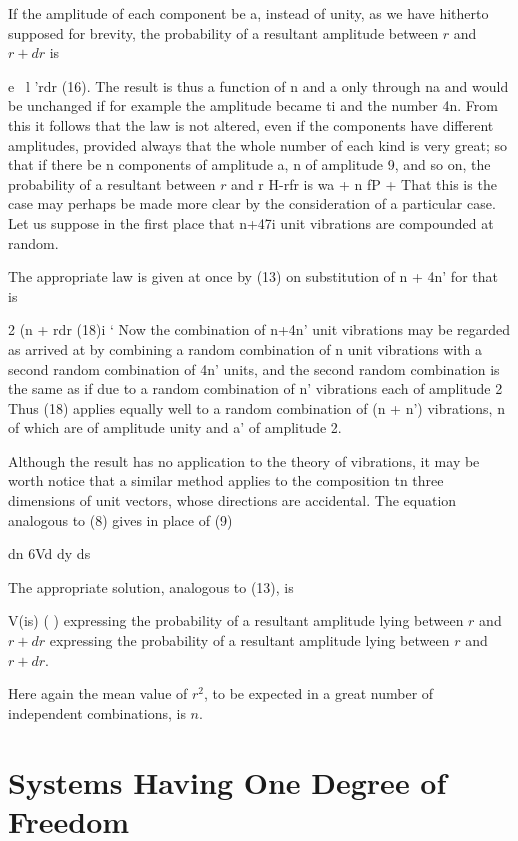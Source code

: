 If the amplitude of each component be a, instead of unity, as we have
hitherto supposed for brevity, the probability of a resultant amplitude
between \(r\) and \(r+dr\) is

e~ l 'rdr (16). The result is thus a function of n and a only through na
and would be unchanged if for example the amplitude became ti and the
number 4n. From this it follows that the law is not altered, even if the
components have different amplitudes, provided always that the whole
number of each kind is very great; so that if there be n components of
amplitude a, n of amplitude 9, and so on, the probability of a resultant
between \(r\) and r H-rfr is wa + n fP + That this is the case may perhaps
be made more clear by the consideration of a particular case. Let us
suppose in the first place that n+47i unit vibrations are compounded at random.

The appropriate law is given at once by (13) on substitution of n + 4n'
for that is

2 (n + rdr (18)i ` Now the combination of n+4n' unit vibrations may be
regarded as arrived at by combining a random combination of n unit
vibrations with a second random combination of 4n' units, and the second
random combination is the same as if due to a random combination of n'
vibrations each of amplitude 2 Thus (18) applies equally well to a
random combination of (n + n') vibrations, n of which are of amplitude
unity and a' of amplitude 2.

Although the result has no application to the theory of vibrations, it
may be worth notice that a similar method applies to the composition tn
three dimensions of unit vectors, whose directions are accidental. The
equation analogous to (8) gives in place of (9)

dn 6Vd dy ds

The appropriate solution, analogous to (13), is

V(is) ( )
expressing the probability of a resultant amplitude lying between \(r\) and
\(r+dr\) expressing the probability of a resultant amplitude lying
between \(r\) and \(r+dr\).

Here again the mean value of \(r^2\), to be expected in a great
number of independent combinations, is \(n\).

\chapter{Systems Having One Degree of Freedom}
\label{systems-having-one-degree-of-freedom}

